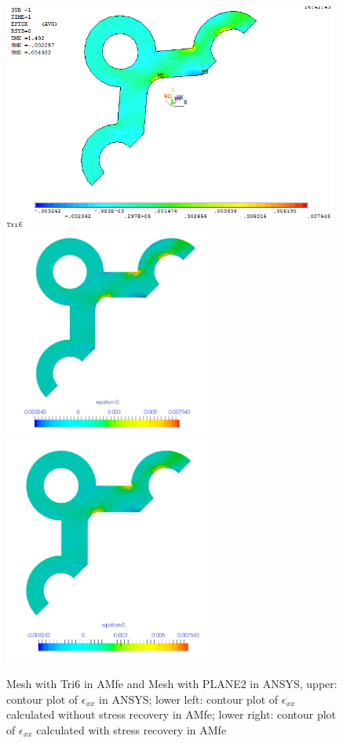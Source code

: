 \begin{figure}[htbp]
	\begin{center}
		\includegraphics[width=11cm,clip]{Tri6_Exx.png} 	
		\includegraphics[width=7cm,clip]{Tri6_Exx_PD.png} 		
		\includegraphics[width=7cm,clip]{Tri6_Exx_P.png} 		
		\caption{Mesh with Tri6 in AMfe and Mesh with PLANE2 in ANSYS, upper: contour plot of $\epsilon_{xx}$ in ANSYS; lower left: contour plot of $\epsilon_{xx}$ calculated without stress recovery in AMfe; lower right: contour plot of $\epsilon_{xx}$ calculated with stress recovery in AMfe} \label{fig: Tri6_Exx}
	\end{center}
\end{figure}
\clearpage 

